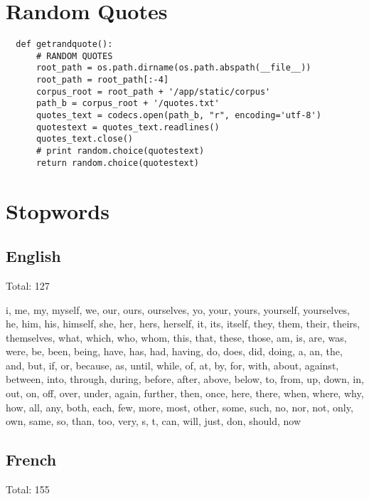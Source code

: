\section{Random Quotes}

\begin{verbatim}
  def getrandquote():
      # RANDOM QUOTES
      root_path = os.path.dirname(os.path.abspath(__file__))
      root_path = root_path[:-4]
      corpus_root = root_path + '/app/static/corpus'
      path_b = corpus_root + '/quotes.txt'
      quotes_text = codecs.open(path_b, "r", encoding='utf-8')
      quotestext = quotes_text.readlines()
      quotes_text.close()
      # print random.choice(quotestext)
      return random.choice(quotestext)
\end{verbatim}


\section{Stopwords}
\label{s:stopwords}


\subsection{English}
 
Total: 127

i, me, my, myself, we, our, ours, ourselves, yo, your, yours, yourself, yourselves, he, him, his, himself, she, her, hers, herself, it, its, itself, they, them, their, theirs, themselves, what, which, who, whom, this, that, these, those, am, is, are, was, were, be, been, being, have, has, had, having, do, does, did, doing, a, an, the, and, but, if, or, because, as, until, while, of, at, by, for, with, about, against, between, into, through, during, before, after, above, below, to, from, up, down, in, out, on, off, over, under, again, further, then, once, here, there, when, where, why, how, all, any, both, each, few, more, most, other, some, such, no, nor, not, only, own, same, so, than, too, very, s, t, can, will, just, don, should, now


\subsection{French}

Total: 155

